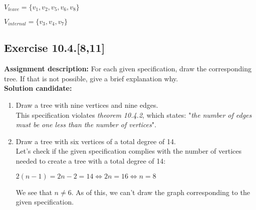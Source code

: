 \documentclass{report}
\newcommand{\cent}[1]{\begin{center}#1\end{center}}
\newcommand{\AssignmentDescription}{\textbf{Assignment description: }}
\newcommand{\Solution}{\textbf{Solution candidate: }}
\newcommand{\Exercise}[1]{\subsection{Exercise #1}}
\newcommand{\defaultEnumerateLabel}{\textbf{\alph*.}}
\newcommand{\MyItem}[1]{\item #1\\}
\begin{document}
	\cent{$V_{leave} = \{v_1, v_2, v_5, v_6,v_8\}$}
	\cent{$V_{internal} = \{v_3,v_4,v_7\}$}
	
	\Exercise{10.4.[8,11]}
	
	\AssignmentDescription
	For each given specification, draw the corresponding tree. If that is not possible, give a brief explanation why.\\
	
	\Solution
	
	\begin{enumerate}[label=\defaultEnumerateLabel]
		\MyItem{Draw a tree with nine vertices and nine edges.}
		
		This specification violates \textit{theorem 10.4.2}, which states: "\textit{the number of edges must be one less than the number of vertices}". 
		
		\MyItem{Draw a tree with six vertices of a total degree of 14.}
		
		Let's check if the given specification complies with the number of vertices needed to create a tree with a total degree of 14:
		
		\cent{$ 2(n-1) = 2n -2 = 14  \Leftrightarrow  2n = 16 \Leftrightarrow n=8 $}
		
		We see that $n \neq 6$. As of this, we can't draw the graph corresponding to the given specification.
	\end{enumerate}
\end{document}
